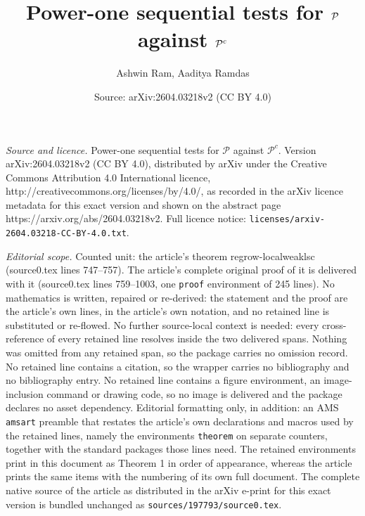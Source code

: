 \documentclass[10pt,a4paper]{amsart}
\title{Power-one sequential tests for \texorpdfstring{$\Pcal$ against $\Pcal^c$}{P against P-complement}}
\author{Ashwin Ram, Aaditya Ramdas}
\date{Source: arXiv:2604.03218v2 (CC BY 4.0)}
\newcommand{\Pcal}{\mathcal{P}}
\begin{document}
\maketitle

\noindent\emph{Source and licence.} Power-one sequential tests for \texorpdfstring{$\Pcal$ against $\Pcal^c$}{P against P-complement}. Version arXiv:2604.03218v2 (CC BY 4.0), distributed by arXiv under the Creative Commons Attribution 4.0 International licence, http://creativecommons.org/licenses/by/4.0/, as recorded in the arXiv licence metadata for this exact version and shown on the abstract page https://arxiv.org/abs/2604.03218v2. Full licence notice: \texttt{licenses/arxiv-2604.03218-CC-BY-4.0.txt}.\par\smallskip

\noindent\textit{Editorial scope.} Counted unit: the article's theorem regrow-localweaklsc (source0.tex lines 747--757). The article's complete original proof of it is delivered with it (source0.tex lines 759--1003, one \texttt{proof} environment of 245 lines). No mathematics is written, repaired or re-derived: the statement and the proof are the article's own lines, in the article's own notation, and no retained line is substituted or re-flowed.  No further source-local context is needed: every cross-reference of every retained line resolves inside the two delivered spans.  Nothing was omitted from any retained span, so the package carries no omission record.  No retained line contains a citation, so the wrapper carries no bibliography and no bibliography entry.  No retained line contains a figure environment, an image-inclusion command or drawing code, so no image is delivered and the package declares no asset dependency.  Editorial formatting only, in addition: an AMS \texttt{amsart} preamble that restates the article's own declarations and macros used by the retained lines, namely the environments \texttt{theorem} on separate counters, together with the standard packages those lines need.  The retained environments print in this document as Theorem 1 in order of appearance, whereas the article prints the same items with the numbering of its own full document.  The complete native source of the article as distributed in the arXiv e-print for this exact version is bundled unchanged as \texttt{sources/197793/source0.tex}.
\end{document}
